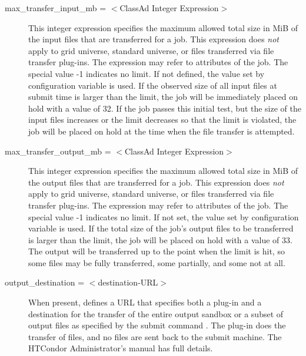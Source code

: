 \begin{description}
\label{man-condor-submit-max-transfer-input-mb}
\item[max\_transfer\_input\_mb = $<$ClassAd Integer Expression$>$] 
This integer expression specifies the maximum allowed total size in
MiB of the input files that are transferred for a job.  This
expression does \emph{not} apply to grid universe, standard universe, or
files transferred via file transfer plug-ins.  The expression may refer
to attributes of the job.  The special value -1 indicates no limit.
If not defined, the value set by configuration variable
 is used.  
If the observed size of all input files at submit time is
larger than the limit, the job will be immediately placed on hold with
a  value of 32.
If the job passes this initial test, but the size of
the input files increases or the limit decreases so that the limit is
violated, the job will be placed on hold at the time when the file
transfer is attempted.

\label{man-condor-submit-max-transfer-output-mb}
\item[max\_transfer\_output\_mb = $<$ClassAd Integer Expression$>$] 
This integer expression specifies the maximum allowed total size in
MiB of the output files that are transferred for a job.  This
expression does \emph{not} apply to grid universe, standard universe, or
files transferred via file transfer plug-ins.  The expression may refer
to attributes of the job.  The special value -1 indicates no limit.
If not set, the value set by configuration variable
 is used.  
If the total size of the job's output files to be transferred
is larger than the limit, the job will be placed on hold with
a  value of 33.
The output will be transferred up to the point when the
limit is hit, so some files may be fully transferred, some partially,
and some not at all.


\label{man-condor-submit-output-destintation}
\item[output\_destination = $<$destination-URL$>$] 
When present, defines a URL that specifies both a plug-in and a
destination for the transfer of the entire output sandbox or
a subset of output files as specified by the submit command
.
The plug-in does the transfer of files, 
and no files are sent back to the submit machine.
The HTCondor Administrator's manual has full details.


\end{description}
